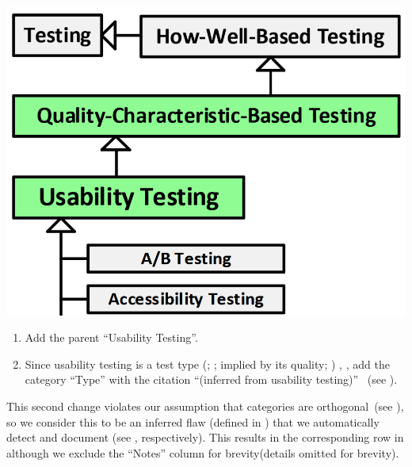 \begin{minipage}{0.45\linewidth}
    \vspace{0.5cm}
    \includegraphics[width=\linewidth]{assets/images/a-b testing 2.png}
    \label{fig:Firesmith-A-B-Testing}
    \vspace{0.5cm}
\end{minipage}
\begin{minipage}{\ifnotpaper 0.53\else 0.5\fi\linewidth}
    \begin{enumerate}
        \item Add the parent ``Usability Testing''.
        \item Since usability testing is a test type \ifnotpaper
                  (\citealp[pp.~22, 26\=/27]{IEEE2022};
                  \citeyear[pp.~7, 40, Tab.~A.1]{IEEE2021};
                  implied by its quality; \citealp[p.~53]{Firesmith2015})\else
                  \cite[pp.~22, 26\=/27]{IEEE2022},
                  \cite[pp.~7, 40, Tab.~A.1]{IEEE2021}\fi, add the category
              ``Type'' with the citation ``(inferred from usability testing)''%
              \ifnotpaper\ (see )\fi.
    \end{enumerate}
\end{minipage}
This second change violates our assumption that categories are
orthogonal\ifnotpaper\ (see )\fi, so we consider this to be
an inferred flaw \ifnotpaper (defined in ) \fi that we
automatically detect and document \ifnotpaper (see , respectively). This results in the corresponding row
    in  although we exclude the ``Notes''
    column for brevity\else (details omitted for brevity)\fi.

